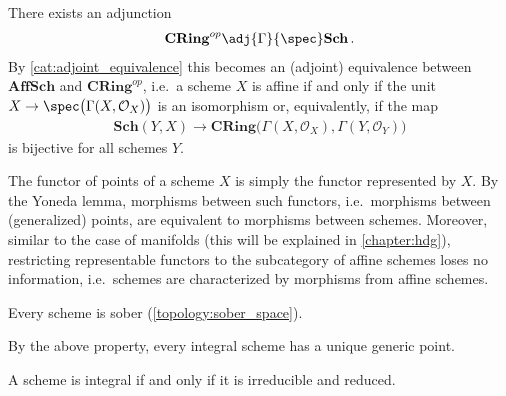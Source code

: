     \begin{property}
        There exists an adjunction
        \begin{gather}
            \mathbf{CRing}^{op}\adj{\Gamma}{\spec}\mathbf{Sch}\,.
        \end{gather}
        By \cref{cat:adjoint_equivalence} this becomes an (adjoint) equivalence between $\mathbf{AffSch}$ and $\mathbf{CRing}^{op}$, i.e.~a scheme $X$ is affine if and only if the unit $X\rightarrow\spec\big(\Gamma(X,\mathcal{O}_X)\big)$ is an isomorphism or, equivalently, if the map
        \begin{gather}
            \mathbf{Sch}(Y,X)\rightarrow\mathbf{CRing}\bigl(\Gamma(X,\mathcal{O}_X),\Gamma(Y,\mathcal{O}_Y)\bigr)
        \end{gather}
        is bijective for all schemes $Y$.
    \end{property}

    \begin{property}
        The functor of points of a scheme $X$ is simply the functor represented by $X$. By the Yoneda lemma, morphisms between such functors, i.e.~morphisms between (generalized) points, are equivalent to morphisms between schemes. Moreover, similar to the case of manifolds (this will be explained in \cref{chapter:hdg}), restricting representable functors to the subcategory of affine schemes loses no information, i.e.~schemes are characterized by morphisms from affine schemes.
    \end{property}

    \begin{property}[Sober]
        Every scheme is sober (\cref{topology:sober_space}).
    \end{property}

    \begin{property}
        By the above property, every integral scheme has a unique generic point.
    \end{property}

    \begin{property}
        A scheme is integral if and only if it is irreducible and reduced.
    \end{property}

